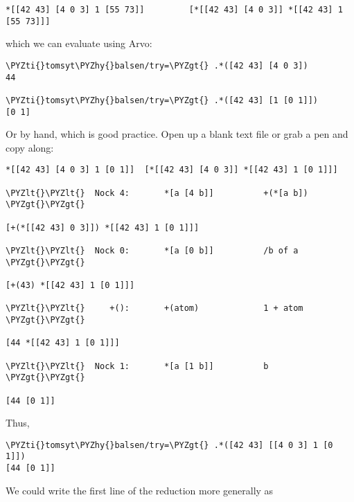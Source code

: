 \begin{framed_shaded}
\begin{Verbatim}[fontsize=\relsize{-2.5},fontseries=b,commandchars=\\\{\}]
*[[42 43] [4 0 3] 1 [55 73]]         [*[[42 43] [4 0 3]] *[[42 43] 1 [55 73]]]
\end{Verbatim}
\end{framed_shaded}
which we can evaluate using Arvo:

\begin{framed_shaded}
\begin{Verbatim}[fontsize=\relsize{-2.5},fontseries=b,commandchars=\\\{\}]
\PYZti{}tomsyt\PYZhy{}balsen/try=\PYZgt{} .*([42 43] [4 0 3])
44

\PYZti{}tomsyt\PYZhy{}balsen/try=\PYZgt{} .*([42 43] [1 [0 1]])
[0 1]
\end{Verbatim}
\end{framed_shaded}
Or by hand, which is good practice. Open up a blank text file or grab a pen and
copy along:

\begin{framed_shaded}
\begin{Verbatim}[fontsize=\relsize{-2.5},fontseries=b,commandchars=\\\{\}]
*[[42 43] [4 0 3] 1 [0 1]]  [*[[42 43] [4 0 3]] *[[42 43] 1 [0 1]]]

\PYZlt{}\PYZlt{}  Nock 4:       *[a [4 b]]          +(*[a b]) \PYZgt{}\PYZgt{}

[+(*[[42 43] 0 3]]) *[[42 43] 1 [0 1]]]

\PYZlt{}\PYZlt{}  Nock 0:       *[a [0 b]]          /b of a  \PYZgt{}\PYZgt{}
       
[+(43) *[[42 43] 1 [0 1]]]

\PYZlt{}\PYZlt{}     +():       +(atom)             1 + atom  \PYZgt{}\PYZgt{}

[44 *[[42 43] 1 [0 1]]]

\PYZlt{}\PYZlt{}  Nock 1:       *[a [1 b]]          b  \PYZgt{}\PYZgt{}

[44 [0 1]] 
\end{Verbatim}
\end{framed_shaded}
Thus,

\begin{framed_shaded}
\begin{Verbatim}[fontsize=\relsize{-2.5},fontseries=b,commandchars=\\\{\}]
\PYZti{}tomsyt\PYZhy{}balsen/try=\PYZgt{} .*([42 43] [[4 0 3] 1 [0 1]])
[44 [0 1]]
\end{Verbatim}
\end{framed_shaded}
We could write the first line of the reduction more generally as  

